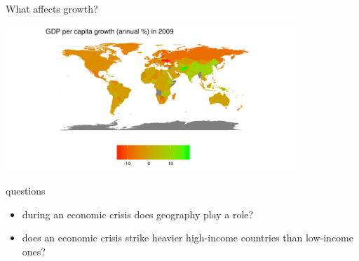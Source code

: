 \documentclass[9pt]{beamer}
\begin{document}
\begin{frame}{What affects growth?}
	\begin{block}{}
		\includegraphics[height=5.5cm]{mappa.png}
	\end{block}
	\begin{block}{questions}
		\begin{itemize}
			\item during an economic crisis does geography play a role?
			\item does an economic crisis strike heavier high-income countries than low-income ones?
		\end{itemize}
	\end{block}
\end{frame}

\end{document}

